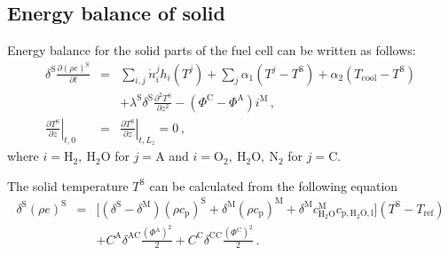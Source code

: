 \documentclass[pdftex,a4paper, 12pt]{article}
\begin{document}
\subsection{Energy balance of solid}
%
%
Energy balance for the solid parts of the fuel cell can be written as follows:
%
\begin{eqnarray}
	\delta^{\mathrm{S}} \frac{\partial (\rho e)^{\mathrm{S}}}{\partial t} &=& \sum_{i,j} \dot{n}_{i}^{j} h_{i}(T^{j})  + \sum_{j} \alpha_1 (T^{j} - T^{\mathrm{S}}) + \alpha_2 (T_{\mathrm{cool}} - T^{\mathrm{S}}) \nonumber \\ &&+ \lambda^{\mathrm{S}} \delta^{\mathrm{S}} \frac{\partial^2 T^{\mathrm{S}}}{\partial z^2} - (\mathit{\Phi}^{\mathrm{C}} - \mathit{\Phi}^{\mathrm{A}}) i^{\mathrm{M}} \, , \label{eq:energy_balS} \\
	\left. \frac{\partial T^{\mathrm{S}}}{\partial z} \right|_{t,0} &=& \left. \frac{\partial T^{\mathrm{S}}}{\partial z} \right|_{t,L_{z}} = 0 \, , \label{eq:energy_balS_bc}
\end{eqnarray}
%
where $i = \mathrm{H_2}, ~\mathrm{H_2O}$ for $j = \mathrm{A}$ and $i = \mathrm{O_2}, ~\mathrm{H_2O}, ~\mathrm{N_2}$ for $j = \mathrm{C}$.
%
\par
%
%
The solid temperature $T^{\mathrm{S}}$ can be calculated from the following equation
%
\begin{eqnarray}
	\delta^{\mathrm{S}} (\rho e)^{\mathrm{S}} &=& \Big[ (\delta^{\mathrm{S}}-\delta^{\mathrm{M}}) (\rho c_{\mathrm{p}})^{\mathrm{S}} + \delta^{\mathrm{M}} (\rho c_{\mathrm{p}})^{\mathrm{M}} + \delta^{\mathrm{M}} c_{\mathrm{H_2O}}^{\mathrm{M}} c_{\mathrm{p,H_2O,l}} \Big] (T^{\mathrm{S}} - T_{\mathrm{ref}}) \nonumber \\
	&&+ C^{\mathrm{A}} \delta^{\mathrm{AC}} \frac{(\mathit{\Phi}^{\mathrm{A}})^2}{2} + C^{\mathrm{C}} \delta^{\mathrm{CC}} \frac{(\mathit{\Phi}^{\mathrm{C}})^2}{2}  \, . \label{eq:tot_energy_approx}
\end{eqnarray}
%
%
%
\end{document}

